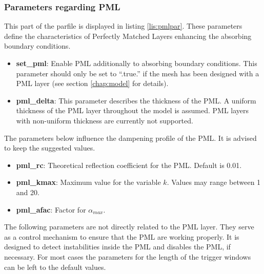 		\medskip

		\subsubsection{Parameters regarding PML}
			This part of the parfile is displayed in listing \ref{lis:pmlpar}. These parameters define the characteristics of Perfectly Matched Layers enhancing the absorbing boundary conditions.
			 
    
    		\begin{itemize}
    	 		\item \textbf{set\_pml}: Enable PML additionally to absorbing boundary conditions. This parameter should only be set to ``.true.'' if the mesh has been designed with a PML layer (see section \ref{chap:model} for details).
    	 		\item \textbf{pml\_delta}: This parameter describes the thickness of the PML. A uniform thickness of the PML layer throughout the model is assumed. PML layers with non-uniform thickness are currently not supported.	 	
    		\end{itemize}
			The parameters below influence the dampening profile of the PML. It is advised to keep the suggested values.
			
			\begin{itemize}
				\item \textbf{pml\_rc}: Theoretical reflection coefficient for the PML. Default is 0.01.
				\item \textbf{pml\_kmax}: Maximum value for the variable $k$. Values may range between 1 and 20.
				\item \textbf{pml\_afac}: Factor for $\alpha_{max}$.
			\end{itemize}
			
			The following parameters are not directly related to the PML layer. They serve as a control mechanism to ensure that the PML are working properly. It is designed to detect instabilities inside the PML and disables the PML, if necessary. For most cases the parameters for the length of the trigger windows can be left to the default values.
			
